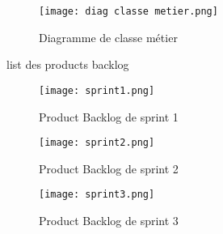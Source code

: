 
\begin{figure}[h]
    \centering
    \texttt{[image: diag classe metier.png]}
    \caption{Diagramme de classe métier}
\end{figure}


list des products backlog

\begin{figure}[h]
    \centering
    \texttt{[image: sprint1.png]}
    \label{Sprint1}
    \caption{Product Backlog de sprint 1}
\end{figure}


\begin{figure}[h]
    \centering
    \texttt{[image: sprint2.png]}
    \label{Sprint2}
    \caption{Product Backlog de sprint 2}
\end{figure}


\begin{figure}[h]
    \centering
    \texttt{[image: sprint3.png]}
    \label{Sprint3}
    \caption{Product Backlog de sprint 3}
\end{figure}




